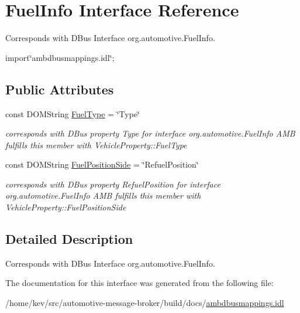 \hypertarget{interfaceFuelInfo}{\section{Fuel\+Info Interface Reference}
\label{interfaceFuelInfo}
}


Corresponds with D\+Bus Interface org.\+automotive.\+Fuel\+Info.  




{\ttfamily import\char`\"{}ambdbusmappings.\+idl\char`\"{};}

\subsection*{Public Attributes}
\begin{DoxyCompactItemize}
\item 
\hypertarget{interfaceFuelInfo_ae03d6729f1cfa4cd66d65c31fc8869af}{const D\+O\+M\+String \hyperlink{interfaceFuelInfo_ae03d6729f1cfa4cd66d65c31fc8869af}{Fuel\+Type} = \char`\"{}Type\char`\"{}}\label{interfaceFuelInfo_ae03d6729f1cfa4cd66d65c31fc8869af}

\begin{DoxyCompactList}\small\item\em corresponds with D\+Bus property Type for interface org.\+automotive.\+Fuel\+Info A\+M\+B fulfills this member with Vehicle\+Property\+::\+Fuel\+Type \end{DoxyCompactList}\item 
\hypertarget{interfaceFuelInfo_ae49699a8b45e535b48ff915ef2998805}{const D\+O\+M\+String \hyperlink{interfaceFuelInfo_ae49699a8b45e535b48ff915ef2998805}{Fuel\+Position\+Side} = \char`\"{}Refuel\+Position\char`\"{}}\label{interfaceFuelInfo_ae49699a8b45e535b48ff915ef2998805}

\begin{DoxyCompactList}\small\item\em corresponds with D\+Bus property Refuel\+Position for interface org.\+automotive.\+Fuel\+Info A\+M\+B fulfills this member with Vehicle\+Property\+::\+Fuel\+Position\+Side \end{DoxyCompactList}\end{DoxyCompactItemize}


\subsection{Detailed Description}
Corresponds with D\+Bus Interface org.\+automotive.\+Fuel\+Info. 

The documentation for this interface was generated from the following file\+:\begin{DoxyCompactItemize}
\item 
/home/kev/src/automotive-\/message-\/broker/build/docs/\hyperlink{ambdbusmappings_8idl}{ambdbusmappings.\+idl}\end{DoxyCompactItemize}
